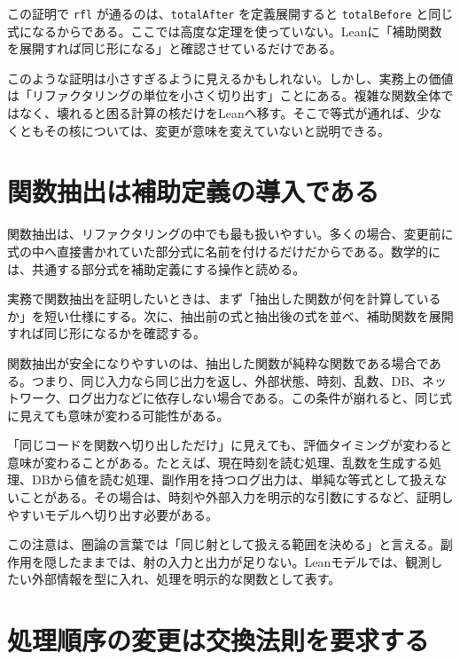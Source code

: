 \begin{leanbox}
この証明で \texttt{rfl} が通るのは、\texttt{totalAfter} を定義展開すると \texttt{totalBefore} と同じ式になるからである。ここでは高度な定理を使っていない。Leanに「補助関数を展開すれば同じ形になる」と確認させているだけである。
\end{leanbox}

このような証明は小さすぎるように見えるかもしれない。しかし、実務上の価値は「リファクタリングの単位を小さく切り出す」ことにある。複雑な関数全体ではなく、壊れると困る計算の核だけをLeanへ移す。そこで等式が通れば、少なくともその核については、変更が意味を変えていないと説明できる。

\section{関数抽出は補助定義の導入である}

関数抽出は、リファクタリングの中でも最も扱いやすい。多くの場合、変更前に式の中へ直接書かれていた部分式に名前を付けるだけだからである。数学的には、共通する部分式を補助定義にする操作と読める。

\begin{softwarebox}
実務で関数抽出を証明したいときは、まず「抽出した関数が何を計算しているか」を短い仕様にする。次に、抽出前の式と抽出後の式を並べ、補助関数を展開すれば同じ形になるかを確認する。
\end{softwarebox}

関数抽出が安全になりやすいのは、抽出した関数が純粋な関数である場合である。つまり、同じ入力なら同じ出力を返し、外部状態、時刻、乱数、DB、ネットワーク、ログ出力などに依存しない場合である。この条件が崩れると、同じ式に見えても意味が変わる可能性がある。

\begin{warningbox}
「同じコードを関数へ切り出しただけ」に見えても、評価タイミングが変わると意味が変わることがある。たとえば、現在時刻を読む処理、乱数を生成する処理、DBから値を読む処理、副作用を持つログ出力は、単純な等式として扱えないことがある。その場合は、時刻や外部入力を明示的な引数にするなど、証明しやすいモデルへ切り出す必要がある。
\end{warningbox}

この注意は、圏論の言葉では「同じ射として扱える範囲を決める」と言える。副作用を隠したままでは、射の入力と出力が足りない。Leanモデルでは、観測したい外部情報を型に入れ、処理を明示的な関数として表す。

\section{処理順序の変更は交換法則を要求する}

